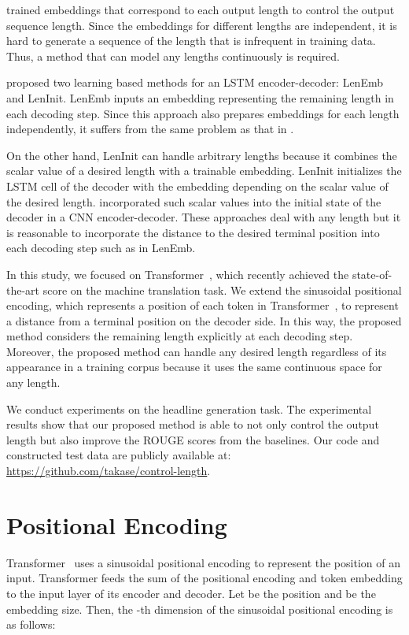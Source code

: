 \documentclass[11pt,a4paper]{article}
\begin{document}
 trained embeddings that correspond to each output length to control the output sequence length.
Since the embeddings for different lengths are independent, it is hard to generate a sequence of the length that is infrequent in training data.
Thus, a method that can model any lengths continuously is required.


 proposed two learning based methods for an LSTM encoder-decoder: LenEmb and LenInit.
LenEmb inputs an embedding representing the remaining length in each decoding step.
Since this approach also prepares embeddings for each length independently, it suffers from the same problem as that in .


On the other hand, LenInit can handle arbitrary lengths because it combines the scalar value of a desired length with a trainable embedding.
LenInit initializes the LSTM cell of the decoder with the embedding depending on the scalar value of the desired length.
 incorporated such scalar values into the initial state of the decoder in a CNN encoder-decoder.
These approaches deal with any length but it is reasonable to incorporate the distance to the desired terminal position into each decoding step such as in LenEmb.



In this study, we focused on Transformer~\cite{NIPS2017_7181}, which recently achieved the state-of-the-art score on the machine translation task.
We extend the sinusoidal positional encoding, which represents a position of each token in Transformer~\cite{NIPS2017_7181}, to represent a distance from a terminal position on the decoder side.
In this way, the proposed method considers the remaining length explicitly at each decoding step.
Moreover, the proposed method can handle any desired length regardless of its appearance in a training corpus because it uses the same continuous space for any length.


We conduct experiments on the headline generation task.
The experimental results show that our proposed method is able to not only control the output length but also improve the ROUGE scores from the baselines.
Our code and constructed test data are publicly available at: \href{https://github.com/takase/control-length}{https://github.com/takase/control-length}.


\section{Positional Encoding}
Transformer~\cite{NIPS2017_7181} uses a sinusoidal positional encoding to represent the position of an input.
Transformer feeds the sum of the positional encoding and token embedding to the input layer of its encoder and decoder.
Let  be the position and  be the embedding size.
Then, the -th dimension of the sinusoidal positional encoding  is as follows:
\end{document}
